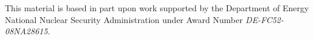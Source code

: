This material is based in part upon work supported by the Department of Energy National Nuclear Security Administration under Award Number {\itshape D\-E-\/\-F\-C52-\/08\-N\-A28615}. 
